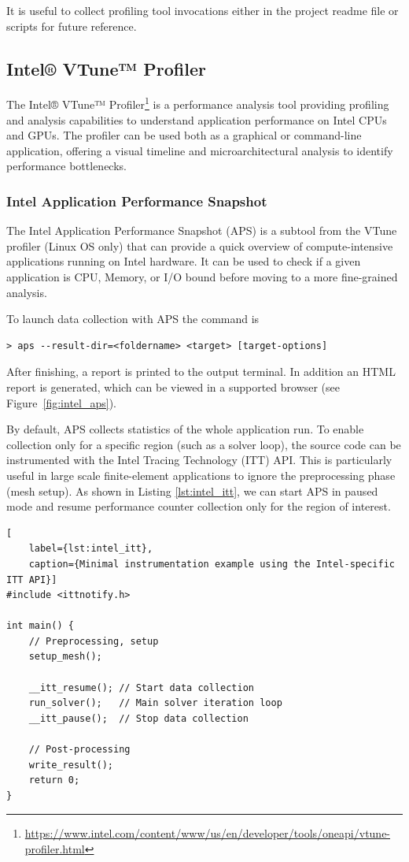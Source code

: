 \documentclass[a4paper,12pt]{article}
\begin{document}
It is useful to collect profiling tool invocations either in the project readme file or scripts for future reference.

\subsection{{Intel® VTune™ Profiler}}

The Intel® VTune™ Profiler\footnote{\url{https://www.intel.com/content/www/us/en/developer/tools/oneapi/vtune-profiler.html}} is a performance analysis tool providing profiling
and analysis capabilities to understand application performance on Intel CPUs and GPUs.
The profiler can be used both as a graphical or command-line application,
offering a visual timeline and microarchitectural analysis to identify
performance bottlenecks.

\subsubsection{Intel Application Performance Snapshot}

The Intel Application Performance Snapshot (APS) is a subtool from the VTune profiler
(Linux OS only)
that can provide a quick overview of compute-intensive applications running
on Intel hardware.
It can be used to check if a given application is CPU, Memory, or I/O bound
before moving to a more fine-grained analysis.

To launch data collection with APS the command is
\begin{verbatim}
> aps --result-dir=<foldername> <target> [target-options]
\end{verbatim}
After finishing, a report is printed to the output terminal.
In addition an HTML report is generated, which can be viewed in a
supported browser (see Figure~\ref{fig:intel_aps}).

By default, APS collects statistics of the whole application run.
To enable collection only for a specific region (such as a solver loop),
the source code can be instrumented
with the Intel Tracing Technology (ITT) API.
This is particularly useful in large scale finite-element applications to
ignore the preprocessing phase (mesh setup).
As shown in Listing \ref{lst:intel_itt}, we can start APS in paused mode and resume
performance counter collection only for the region of interest.

\begin{lstlisting}[
    label={lst:intel_itt},
    caption={Minimal instrumentation example using the Intel-specific ITT API}]
#include <ittnotify.h>

int main() {
    // Preprocessing, setup
    setup_mesh();

    __itt_resume(); // Start data collection
    run_solver();   // Main solver iteration loop
    __itt_pause();  // Stop data collection

    // Post-processing
    write_result();
    return 0;
}
\end{lstlisting}
\end{document}
